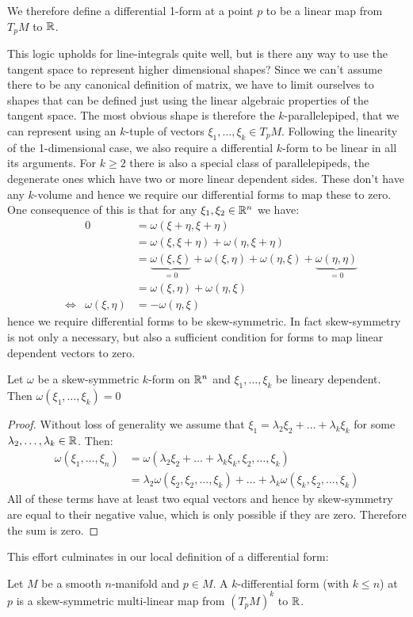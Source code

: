 We therefore define a differential 1-form at a point $p$ to be a linear map from
$T_pM$ to $\mathbb{R}$.

This logic upholds for line-integrals quite well, but is there any way to use the
tangent space to represent higher dimensional shapes? Since we can't assume there
to be any canonical definition of matrix, we have to limit ourselves to shapes that
can be defined just using the linear algebraic properties of the tangent space. The
most obvious shape is therefore the $k$-parallelepiped, that we can represent using
an $k$-tuple of vectors $\xi_1, \dots, \xi_k \in T_pM$. Following the linearity of 
the 1-dimensional case, we also require a differential $k$-form to be linear in all
its arguments. For $k \geq 2$ there is also a special class of parallelepipeds,
the degenerate ones which have two or more linear dependent sides. These don't have
any $k$-volume and hence we require our differential forms to map these to zero.
One consequence of this is that for any $\xi_1, \xi_2 \in \mathbb{R}^n$ we have:
\begin{align*}
&&	 0 &= \omega(\xi + \eta, \xi + \eta) \\
&&	   &= \omega(\xi, \xi + \eta) + \omega(\eta, \xi + \eta) \\
&&	   &= \underbrace{\omega(\xi, \xi)}_{= 0} + \omega(\xi, \eta) + \omega(\eta, \xi) + \underbrace{\omega(\eta, \eta)}_{= 0} \\
&&	   &= \omega(\xi, \eta) + \omega(\eta, \xi) \\
&\iff& \omega(\xi,\eta) &= - \omega(\eta,\xi)
\end{align*}
hence we require differential forms to be skew-symmetric. In fact skew-symmetry is
not only a necessary, but also a sufficient condition for forms to map linear
dependent vectors to zero.
\begin{lemma}
	Let $\omega$ be a skew-symmetric $k$-form on $\mathbb{R}^n$ and $\xi_1, \dots, \xi_k$
	be lineary dependent. Then $\omega(\xi_1, \dots, \xi_k) = 0$
\end{lemma}
\begin{proof}
	Without loss of generality we assume that $\xi_1 = \lambda_2 \xi_2 + \dots + \lambda_k \xi_k$
	for some $\lambda_2, \dots, \lambda_k \in \mathbb{R}$. Then:
	\begin{align*}
		\omega(\xi_1, \dots, \xi_n)
		&=
		\omega(\lambda_2 \xi_2 + \dots + \lambda_k \xi_k, \xi_2, \dots, \xi_k) \\
		&=
		\lambda_2 \omega(\xi_2, \xi_2, \dots, \xi_k) + \dots + \lambda_k \omega(\xi_k, \xi_2, \dots, \xi_k)
	\end{align*}
	All of these terms have at least two equal vectors and hence by skew-symmetry are equal to their
	negative value, which is only possible if they are zero. Therefore the sum is zero.
\end{proof}
This effort culminates in our local definition of a differential form:
\begin{definition}
Let $M$ be a smooth $n$-manifold and $p \in M$. A $k$-differential form (with $k \leq n$)
at $p$ is a skew-symmetric multi-linear map from $(T_p M)^k$ to $\mathbb{R}$.
\end{definition}

